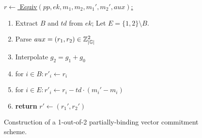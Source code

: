 \begin{figure}
\begin{construction}[]
    \underline{$r \leftarrow$ Equiv$(pp, ek, m_1, m_2, m_1', m_2', aux)$:}
    \begin{enumerate}
      \item Extract $B$ and $td$ from $ek$; Let $E = \{1,2\} \setminus B$.
      \item Parse $aux = (r_1, r_2) \in \mathbb{Z}_{|\mathbb{G}|}^2$
      \item Interpolate $g_2 = g_1 + g_0$
      \item for $i \in B: r'_i \leftarrow r_i$
      \item for $i \in E: r'_i \leftarrow r_i - td \cdot (m_i' - m_i)$
      \item \textbf{return} $r' \leftarrow (r_1', r_2')$
    \end{enumerate}
  \end{construction}
  \caption{Construction of a 1-out-of-2 partially-binding vector commitment scheme.}
  \label{fig:half-binding}
\end{figure}

